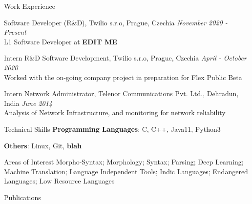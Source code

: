 \documentclass{resume}
\begin{document}
\begin{rSection}{Work Experience}

    {Software Developer (R\&D), Twilio s.r.o, Prague, Czechia}
        \hfill {\em November 2020 - Present}\\
            L1 Software Developer at \textbf{EDIT ME}
            
    {Intern R\&D Software Development, Twilio s.r.o, Prague, Czechia}
        \hfill {\em April - October 2020}\\
            Worked with the on-going company project in preparation for Flex 
            Public Beta

    {Intern Network Administrator, Telenor Communications Pvt. Ltd., Dehradun, 
    India}
        \hfill {\em June 2014}\\
            Analysis of Network Infrastructure, and monitoring for 
            network reliability

\end{rSection}



\begin{rSection}{Technical Skills}
    {\textbf{Programming Languages}: C, C++, Java11, Python3}
    
    {\textbf{Others}: Linux, Git, \textbf{blah}}
    
    \begin{rSubsection}{Areas of Interest}{}{}{}
        Morpho-Syntax; Morphology; Syntax; Parsing; Deep Learning; Machine Translation; 
        Language Independent Tools; Indic Languages; Endangered Languages; Low Resource 
        Languages
    \end{rSubsection}
\end{rSection}


\begin{rSection}{Publications}

    {}

    {}

    {}
    
    {}

    {}

\end{rSection}
\end{document}
